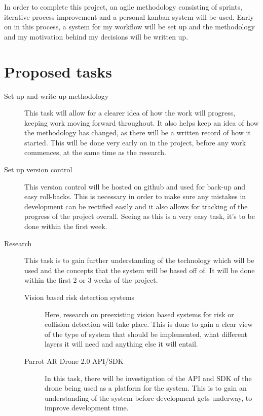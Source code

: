 \documentclass[11pt,fleqn,twoside]{article}
\begin{document}
In order to complete this project, an agile methodology consisting of sprints, iterative process improvement and a personal kanban system\cite{PersonalKanban} will be used. Early on in this process, a system for my workflow will be set up and the methodology and my motivation behind my decisions will be written up.
\section{Proposed tasks}
\begin{description}
  \item[Set up and write up methodology]
    This task will allow for a clearer idea of how the work will progress, keeping work moving forward throughout. It also helps keep an idea of how the methodology has changed, as there will be a written record of how it started. This will be done very early on in the project, before any work commences, at the same time as the research.
  \item[Set up version control]
    This version control will be hosted on github and used for back-up and easy roll-backs. This is necessary in order to make sure any mistakes in development can be rectified easily and it also allows for tracking of the progress of the project overall. Seeing as this is a very easy task, it's to be done within the first week.
  \item[Research]
  This task is to gain further understanding of the technology which will be used and the concepts that the system will be based off of. It will be done within the first 2 or 3 weeks of the project.
    \begin{description}
      \item[Vision based risk detection systems]
        Here, research on preexisting vision based systems for risk or collision detection will take place. This is done to gain a clear view of the type of system that should be implemented, what different layers it will need and anything else it will entail.
      \item[Parrot AR Drone 2.0 API/SDK]
        In this task, there will be investigation of the API and SDK\cite{DroneAPI} of the drone being used as a platform for the system. This is to gain an understanding of the system before development gets underway, to improve development time. 
    \end{description}

\end{description}
\end{document}
